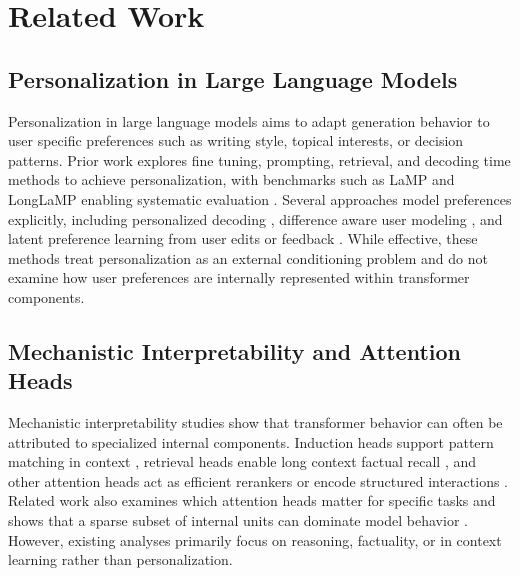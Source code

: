 \documentclass[11pt]{article}
\begin{document}
\section{Related Work}

\subsection{Personalization in Large Language Models}

Personalization in large language models aims to adapt generation behavior to user specific preferences such as writing style, topical interests, or decision patterns.
Prior work explores fine tuning, prompting, retrieval, and decoding time methods to achieve personalization, with benchmarks such as LaMP and LongLaMP enabling systematic evaluation \cite{DBLP:conf/acl/SalemiMBZ24,adaptivepersonalizedcir}.
Several approaches model preferences explicitly, including personalized decoding \cite{DBLP:conf/iclr/ChenZLCL25}, difference aware user modeling \cite{DBLP:conf/acl/Qiu00B00FC25}, and latent preference learning from user edits or feedback \cite{DBLP:conf/icml/TuckerBCJ24,DBLP:conf/nips/GaoTSMM24}.
While effective, these methods treat personalization as an external conditioning problem and do not examine how user preferences are internally represented within transformer components.





\subsection{Mechanistic Interpretability and Attention Heads}

Mechanistic interpretability studies show that transformer behavior can often be attributed to specialized internal components.
Induction heads support pattern matching in context \cite{DBLP:conf/naacl/CrosbieS25}, retrieval heads enable long context factual recall \cite{DBLP:conf/iclr/WuWX0F25,DBLP:journals/corr/abs-2506-09944}, and other attention heads act as efficient rerankers or encode structured interactions \cite{DBLP:conf/iclr/ChenGS25,DBLP:conf/acl/QuYLWLDC25}.
Related work also examines which attention heads matter for specific tasks and shows that a sparse subset of internal units can dominate model behavior \cite{DBLP:conf/icml/YinS25,DBLP:conf/acl/Jiao0TMPA24}.
However, existing analyses primarily focus on reasoning, factuality, or in context learning rather than personalization.
\end{document}
